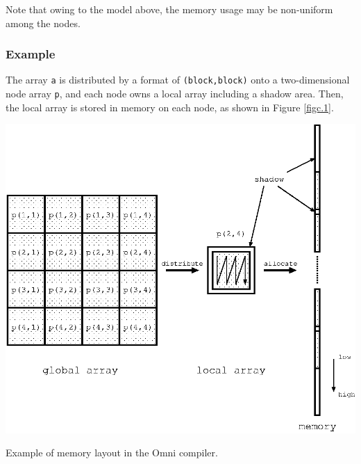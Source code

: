 Note that owing to the model above, the memory usage may be
non-uniform among the nodes.

\subsubsection*{Example}


The array {\tt a} is distributed by a format of {\tt (block,block)} onto
a two-dimensional node array {\tt p}, and each node owns a local array
including a shadow area. Then, the local array is stored in memory on
each node, as shown in Figure \ref{figc.1}.

\begin{myfigure}
 \includegraphics[scale=0.9]{figs/figc.1.eps}
 \caption{Example of memory layout in the Omni {\XMP} compiler.}
 \label{figc.1}
\end{myfigure}

